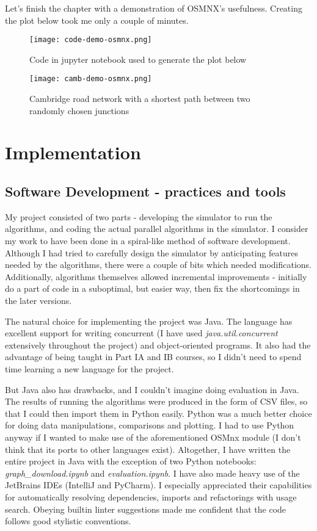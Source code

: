 \documentclass[12pt,a4paper,oneside,openright]{report}
\begin{document}
Let's finish the chapter with a demonstration of OSMNX's usefulness. Creating the plot below took me only a couple of minutes.

\begin{figure}[h]
    \centering
    \texttt{[image: code-demo-osmnx.png]}
    \caption{Code in jupyter notebook used to generate the plot below}
    \label{code:Cambridge}
\end{figure}

\begin{figure}
    \centering
    \texttt{[image: camb-demo-osmnx.png]}
    \caption{Cambridge road network with a shortest path between two randomly chosen junctions}
    \label{map:Cambridge}
\end{figure}

\chapter{Implementation}

\section{Software Development - practices and tools}
My project consisted of two parts - developing the simulator to run the algorithms, and coding the actual parallel algorithms in the simulator. I consider my work to have been done in a spiral-like method of software development. Although I had tried to carefully design the simulator by anticipating features needed by the algorithms, there were a couple of bits which needed modifications. Additionally, algorithms themselves allowed incremental improvements - initially do a part of code in a suboptimal, but easier way, then fix the shortcomings in the later versions.  

The natural choice for implementing the project was Java. The language has excellent support for writing concurrent (I have used \textit{java.util.concurrent} extensively throughout the project) and object-oriented programs. It also had the advantage of being taught in Part IA and IB courses, so I didn't need to spend time learning a new language for the project.

But Java also has drawbacks, and I couldn't imagine doing evaluation in Java. The results of running the algorithms were produced in the form of CSV files, so that I could then import them in Python easily. Python was a much better choice for doing data manipulations, comparisons and plotting. I had to use Python anyway if I wanted to make use of the aforementioned OSMnx module (I don't think that its ports to other languages exist). Altogether, I have written the entire project in Java with the exception of two Python notebooks: \textit{graph\_download.ipynb} and \textit{evaluation.ipynb}. I have also made heavy use of the JetBrains IDEs (IntelliJ and PyCharm). I especially appreciated their capabilities for automatically resolving dependencies, imports and refactorings with usage search. Obeying builtin linter suggestions made me confident that the code follows good stylistic conventions.
\end{document}
